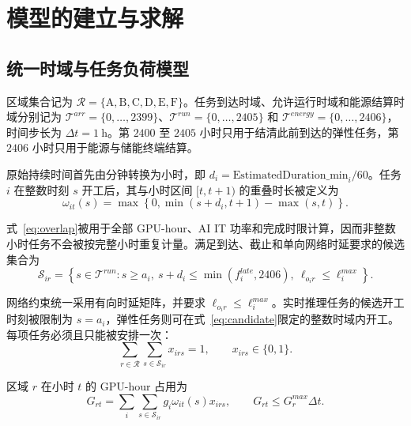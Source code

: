 \section{模型的建立与求解}

\subsection{统一时域与任务负荷模型}

区域集合记为 $\mathcal R=\{\mathrm A,\mathrm B,\mathrm C,\mathrm D,\mathrm E,\mathrm F\}$。任务到达时域、允许运行时域和能源结算时域分别记为 $\mathcal T^{arr}=\{0,\ldots,2399\}$、$\mathcal T^{run}=\{0,\ldots,2405\}$ 和 $\mathcal T^{energy}=\{0,\ldots,2406\}$，时间步长为 $\Delta t=1\ \mathrm h$。第 $2400$ 至 $2405$ 小时只用于结清此前到达的弹性任务，第 $2406$ 小时只用于能源与储能终端结算。


原始持续时间首先由分钟转换为小时，即 $d_i=\mathrm{EstimatedDuration\_min}_i/60$。任务 $i$ 在整数时刻 $s$ 开工后，其与小时区间 $[t,t+1)$ 的重叠时长被定义为
\begin{equation}
\omega_{it}(s)=
\max\left\{0,\min(s+d_i,t+1)-\max(s,t)\right\}.
\label{eq:overlap}
\end{equation}

式~\eqref{eq:overlap}被用于全部 GPU-hour、AI IT 功率和完成时限计算，因而非整数小时任务不会被按完整小时重复计量。满足到达、截止和单向网络时延要求的候选集合为
\begin{equation}
\mathcal S_{ir}=
\left\{
s\in\mathcal T^{run}:s\ge a_i,\
s+d_i\le\min(f_i^{late},2406),\
\ell_{o_ir}\le\ell_i^{max}
\right\}.
\label{eq:candidate}
\end{equation}

网络约束统一采用有向时延矩阵，并要求 $\ell_{o_ir}\le\ell_i^{max}$。实时推理任务的候选开工时刻被限制为 $s=a_i$，弹性任务则可在式~\eqref{eq:candidate}限定的整数时域内开工。每项任务必须且只能被安排一次：
\begin{equation}
\sum_{r\in\mathcal R}\sum_{s\in\mathcal S_{ir}}x_{irs}=1,
\qquad x_{irs}\in\{0,1\}.
\label{eq:unique}
\end{equation}

区域 $r$ 在小时 $t$ 的 GPU-hour 占用为
\begin{equation}
G_{rt}=\sum_i\sum_{s\in\mathcal S_{ir}}
g_i\omega_{it}(s)x_{irs},
\qquad
G_{rt}\le G_r^{max}\Delta t.
\label{eq:gpu}
\end{equation}

